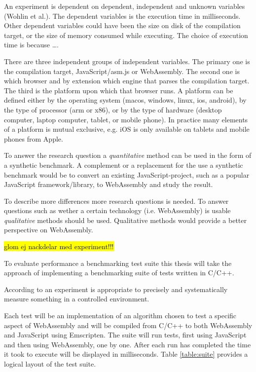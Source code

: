 An experiment is dependent on dependent, independent and unknown variables (Wohlin et al.). 
The dependent variables is the execution time in milliseconds. Other dependent variables could have been the size on disk of the compilation target, or the size of memory consumed while executing. The choice of execution time is because ….

There are three independent groups of independent variables. The primary one is the compilation target, JavaScript/asm.js or WebAssembly. The second one is which browser and by extension which engine that parses the compilation target. The third is the platform upon which that browser runs. A platform can be defined either by the operating system (macos, windows, linux, ios, android), by the type of processor (arm or x86), or by the type of hardware (desktop computer, laptop computer, tablet, or mobile phone). In practice many elements of a platform is mutual exclusive, e.g. iOS is only available on tablets and mobile phones from Apple.


To answer the research question a \emph{quantitative} method can be used in the form of a synthetic benchmark. A complement or a replacement for the use a synthetic benchmark would be to convert an existing JavaScript-project, such as a popular JavaScript framework/library, to WebAssembly and study the result.

To describe more differences more research questions is needed. To answer questions such as wether a certain technology (i.e. WebAssembly) is usable \emph{qualitative} methods should be used. Qualitative methods would provide a better perspective on WebAssembly.

\hl{glom ej nackdelar med experiment!!!}

To evaluate performance a benchmarking test suite this thesis will take the approach of implementing a benchmarking suite of tests written in C/C++. 

According to \textcite{WohlinRunesonHostOhlssonRegnellWesslen2012} an experiment is appropriate to precisely and systematically measure something in a controlled environment.

Each test will be an implementation of an algorithm chosen to test a specific aspect of WebAssembly and will be compiled from C/C++ to both WebAssembly and JavaScript using Emscripten. The suite will run tests, first using JavaScript and then using WebAssembly, one by one. After each run has completed the time it took to execute will be displayed in milliseconds. Table \ref{table:suite} provides a logical layout of the test suite.

